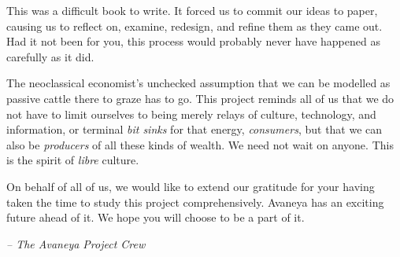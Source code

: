 

This was a difficult book to write. It forced us to commit our ideas to paper, causing us to reflect on, examine, redesign, and refine them as they came out. Had it not been for you, this process would probably never have happened as carefully as it did.

The neoclassical economist's unchecked assumption that we can be modelled as passive cattle there to graze has to go. This project reminds all of us that we do not have to limit ourselves to being merely relays of culture, technology, and information, or terminal {\it bit sinks} for that energy, {\it consumers}, but that we can also be {\it producers} of all these kinds of wealth. We need not wait on anyone. This is the spirit of {\it libre} culture.

On behalf of all of us, we would like to extend our gratitude for your having taken the time to study this project comprehensively. Avaneya has an exciting future ahead of it. We hope you will choose to be a part of it. 

\hskip 1.5cm {\it -- The Avaneya Project Crew}

\StopChapter

